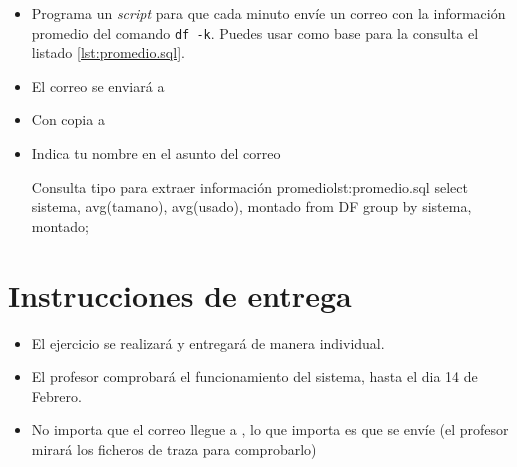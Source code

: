 \begin{homeworkProblem}

  \begin{itemize}
  \item Programa un \textit{script} para que cada minuto envíe un correo con la información promedio del comando  \texttt{df -k}. Puedes usar como base para la consulta el listado \ref{lst:promedio.sql}.
  \item El correo se enviará a  
  \item Con copia a 
  \item Indica tu nombre en el asunto del correo  


\begin{listadoshell}{Consulta tipo para extraer información promedio}{lst:promedio.sql}
  select 
    sistema, avg(tamano), avg(usado), montado
  from 
    DF
  group by
    sistema, montado;
\end{listadoshell}
    
\end{itemize}
\end{homeworkProblem}


\section{Instrucciones de entrega}
\begin{itemize}
\item El ejercicio se realizará y entregará de manera individual.
\item El profesor comprobará el funcionamiento del sistema, hasta el dia 14 de Febrero.
\item No importa que el correo llegue a , lo que importa es que se envíe (el profesor mirará los ficheros de traza para comprobarlo)
  
\end{itemize}

